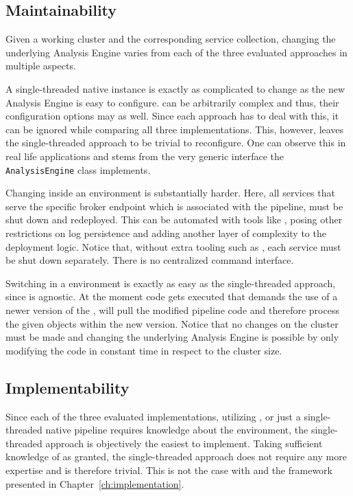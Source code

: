 \subsection{Maintainability}
Given a working \spark{} cluster and the corresponding \uimaas{} service collection, changing the underlying Analysis Engine varies from each of the three evaluated approaches in multiple aspects. 

A single-threaded native \uima{} instance is exactly as complicated to change as the new Analysis Engine is easy to configure. \anens{} can be arbitrarily complex and thus, their configuration options may as well. Since each approach has to deal with this, it can be ignored while comparing all three implementations. This, however, leaves the single-threaded approach to be trivial to reconfigure. One can observe this in real life applications and stems from the very generic interface the \lstinline|AnalysisEngine| class implements.

Changing \anens{} inside an \uimaas{} environment is substantially harder. Here, all services that serve the specific broker endpoint which is associated with the pipeline, must be shut down and redeployed. This can be automated with tools like \docker{}, posing other restrictions on log persistence and adding another layer of complexity to the deployment logic. Notice that, without extra tooling such as \docker{}, each service must be shut down separately. There is no centralized command interface.

Switching \anens{} in a \spark{} environment is exactly as easy as the single-threaded approach, since \spark{} is \uima{} agnostic. At the moment code gets executed that demands the use of a newer version of the \anen{}, \spark{} will pull the modified pipeline code and therefore process the given \cas{} objects within the new \anen{} version. Notice that no changes on the cluster must be made and changing the underlying Analysis Engine is possible by only modifying the code in constant time in respect to the cluster size.
\subsection{Implementability}
Since each of the three evaluated implementations, utilizing \spark{}, \uimaas{} or just a single-threaded native \uima{} pipeline requires knowledge about the \uima{} environment, the single-threaded approach is objectively the easiest to implement. Taking sufficient knowledge of \uima{} as granted, the single-threaded approach does not require any more expertise and is therefore trivial. This is not the case with \uimaas{} and the framework presented in Chapter~\ref{ch:implementation}.

